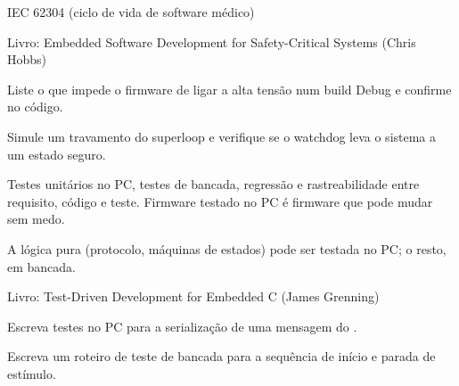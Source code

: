 \begin{paraestudar}
  \item IEC 62304 (ciclo de vida de software médico)
  \item Livro: Embedded Software Development for Safety-Critical Systems (Chris Hobbs)
\end{paraestudar}

\begin{pratique}
  \item Liste o que impede o firmware de ligar a alta tensão num build Debug e confirme no código.
  \item Simule um travamento do superloop e verifique se o watchdog leva o sistema a um estado seguro.
\end{pratique}

Testes unitários no PC, testes de bancada, regressão e rastreabilidade entre requisito, código e teste. Firmware testado no PC é firmware que pode mudar sem medo.

\begin{noproduto}
A lógica pura (protocolo, máquinas de estados) pode ser testada no PC; o resto, em bancada.
\end{noproduto}

\begin{paraestudar}
  \item {}
  \item {}
  \item {}
  \item Livro: Test-Driven Development for Embedded C (James Grenning)
\end{paraestudar}

\begin{pratique}
  \item Escreva testes no PC para a serialização de uma mensagem do .
  \item Escreva um roteiro de teste de bancada para a sequência de início e parada de estímulo.
\end{pratique}
